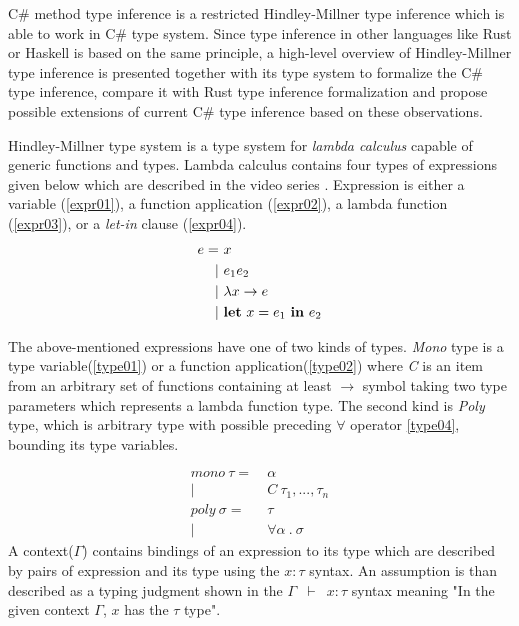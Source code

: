 C\# method type inference is a restricted Hindley-Millner type inference which is able to work in C\# type system.
Since type inference in other languages like Rust or Haskell is based on the same principle, a high-level overview of Hindley-Millner type inference is presented together with its type system to formalize the C\# type inference, compare it with Rust type inference formalization and propose possible extensions of current C\# type inference based on these observations.
\par
Hindley-Millner type system \cite{online:wikiHM} is a type system for \textit{lambda calculus} capable of generic functions and types.
Lambda calculus contains four types of expressions given below which are described in the video series \cite{online:HMVideos}.
Expression is either a variable (\ref{expr01}), a function application (\ref{expr02}), a lambda function (\ref{expr03}), or a \textit{let-in} clause (\ref{expr04}).
\begin{align}
e =&\ x\label{expr01}\\
|&\ e_1 e_2\label{expr02}\\
|&\ \lambda x \rightarrow e\label{expr03}\\
|&\ \text{\textbf{let}}\ x = e_1\ \text{\textbf{in}}\ e_2\label{expr04} 
\end{align}
\par
The above-mentioned expressions have one of two kinds of types.
\textit{Mono} type is a type variable(\ref{type01}) or a function application(\ref{type02}) where \textit{C} is an item from an arbitrary set of functions containing at least \texttt{$\rightarrow$} symbol taking two type parameters which represents a lambda function type.
The second kind is \textit{Poly} type, which is arbitrary type with possible preceding $\forall$ operator \ref{type04}, bounding its type variables.
\par
\begin{align}
mono\ \tau =&\ \alpha\label{type01}\\
|&\ C\ \tau_1,...,\tau_n\label{type02}\\
poly\ \sigma =&\ \tau\label{type03}\\
|&\ \forall \alpha\ .\ \sigma\label{type04}
\end{align}
A context(\texttt{$\Gamma$}) contains bindings of an expression to its type which are described by pairs of expression and its type using the \texttt{$x:\tau$} syntax.
An assumption is than described as a typing judgment shown in the \texttt{$\Gamma$ $\vdash$ $x:\tau$} syntax meaning "In the given context \texttt{$\Gamma$}, \texttt{$x$} has the \texttt{$\tau$} type".
